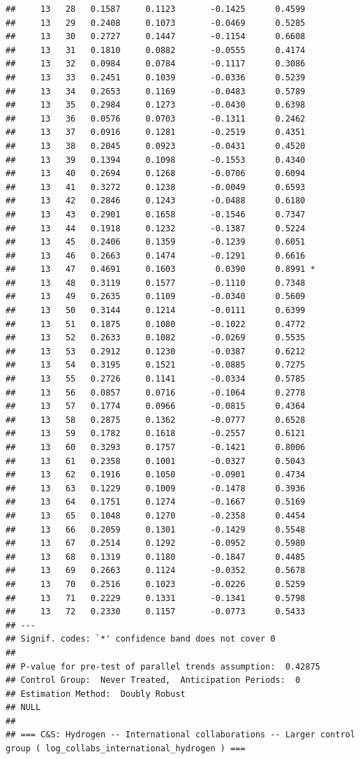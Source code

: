 \documentclass[
]{article}
\begin{document}
\begin{verbatim}
##     13   28   0.1587     0.1123       -0.1425      0.4599  
##     13   29   0.2408     0.1073       -0.0469      0.5285  
##     13   30   0.2727     0.1447       -0.1154      0.6608  
##     13   31   0.1810     0.0882       -0.0555      0.4174  
##     13   32   0.0984     0.0784       -0.1117      0.3086  
##     13   33   0.2451     0.1039       -0.0336      0.5239  
##     13   34   0.2653     0.1169       -0.0483      0.5789  
##     13   35   0.2984     0.1273       -0.0430      0.6398  
##     13   36   0.0576     0.0703       -0.1311      0.2462  
##     13   37   0.0916     0.1281       -0.2519      0.4351  
##     13   38   0.2045     0.0923       -0.0431      0.4520  
##     13   39   0.1394     0.1098       -0.1553      0.4340  
##     13   40   0.2694     0.1268       -0.0706      0.6094  
##     13   41   0.3272     0.1238       -0.0049      0.6593  
##     13   42   0.2846     0.1243       -0.0488      0.6180  
##     13   43   0.2901     0.1658       -0.1546      0.7347  
##     13   44   0.1918     0.1232       -0.1387      0.5224  
##     13   45   0.2406     0.1359       -0.1239      0.6051  
##     13   46   0.2663     0.1474       -0.1291      0.6616  
##     13   47   0.4691     0.1603        0.0390      0.8991 *
##     13   48   0.3119     0.1577       -0.1110      0.7348  
##     13   49   0.2635     0.1109       -0.0340      0.5609  
##     13   50   0.3144     0.1214       -0.0111      0.6399  
##     13   51   0.1875     0.1080       -0.1022      0.4772  
##     13   52   0.2633     0.1082       -0.0269      0.5535  
##     13   53   0.2912     0.1230       -0.0387      0.6212  
##     13   54   0.3195     0.1521       -0.0885      0.7275  
##     13   55   0.2726     0.1141       -0.0334      0.5785  
##     13   56   0.0857     0.0716       -0.1064      0.2778  
##     13   57   0.1774     0.0966       -0.0815      0.4364  
##     13   58   0.2875     0.1362       -0.0777      0.6528  
##     13   59   0.1782     0.1618       -0.2557      0.6121  
##     13   60   0.3293     0.1757       -0.1421      0.8006  
##     13   61   0.2358     0.1001       -0.0327      0.5043  
##     13   62   0.1916     0.1050       -0.0901      0.4734  
##     13   63   0.1229     0.1009       -0.1478      0.3936  
##     13   64   0.1751     0.1274       -0.1667      0.5169  
##     13   65   0.1048     0.1270       -0.2358      0.4454  
##     13   66   0.2059     0.1301       -0.1429      0.5548  
##     13   67   0.2514     0.1292       -0.0952      0.5980  
##     13   68   0.1319     0.1180       -0.1847      0.4485  
##     13   69   0.2663     0.1124       -0.0352      0.5678  
##     13   70   0.2516     0.1023       -0.0226      0.5259  
##     13   71   0.2229     0.1331       -0.1341      0.5798  
##     13   72   0.2330     0.1157       -0.0773      0.5433  
## ---
## Signif. codes: `*' confidence band does not cover 0
## 
## P-value for pre-test of parallel trends assumption:  0.42875
## Control Group:  Never Treated,  Anticipation Periods:  0
## Estimation Method:  Doubly Robust
## NULL
## 
## === C&S: Hydrogen -- International collaborations -- Larger control group ( log_collabs_international_hydrogen ) ===
\end{verbatim}
\end{document}
